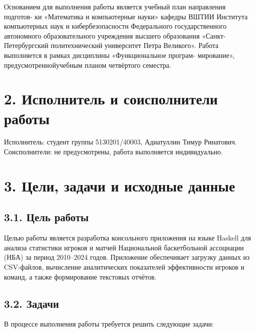 \documentclass[a4paper, final]{article}
\begin{document}
Основанием для выполнения работы является учебный план направления подготов-
ки «Математика и компьютерные науки» кафедры ВШТИИ Института компьютерных
наук и кибербезопасности Федерального государственного автономного образовательного
учреждения высшего образования «Санкт-Петербургский политехнический университет
Петра Великого». Работа выполняется в рамках дисциплины «Функциональное програм-
мирование», предусмотреннойучебным планом четвёртого семестра.

\section*{2. Исполнитель и соисполнители работы}

Исполнитель: студент группы 5130201/40003, Адиатуллин Тимур Ринатович.
Соисполнители: не предусмотрены, работа выполняется индивидуально.

\section*{3. Цели, задачи и исходные данные}

\subsection*{3.1. Цель работы}

Целью работы является разработка консольного приложения на языке Haskell для анализа статистики игроков и матчей Национальной баскетбольной ассоциации (НБА) за период 2010--2024 годов. Приложение обеспечивает загрузку данных из CSV-файлов, вычисление аналитических показателей эффективности игроков и команд, а также формирование текстовых отчётов.

\subsection*{3.2. Задачи}

В процессе выполнения работы требуется решить следующие задачи:
\end{document}
